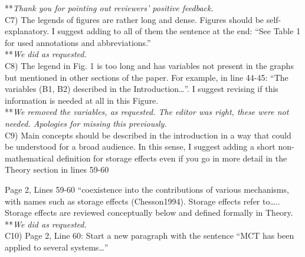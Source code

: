 \documentclass[letterpaper,11pt]{article}
\begin{document}
\noindent ***\emph{Thank you for pointing out reviewers' positive feedback.} \\

\noindent C7) The legends of figures are rather long and dense. Figures should be self-explanatory. I suggest adding to all of them the sentence at the end: “See Table 1 for used annotations and abbreviations.” \\

\noindent ***\emph{We did as requested.} \\

\noindent C8) The legend in Fig. 1 is too long and has variables not present in the graphs but mentioned in other sections of the paper. For example, in line 44-45: “The variables (B1, B2) described in the Introduction…”. I suggest revising if this information is needed at all in this Figure. \\

\noindent ***\emph{We removed the variables, as requested. The editor was right, these were not
needed. Apologies for missing this previously.} \\

\noindent C9) Main concepts should be described in the introduction in a way that could be understood for a broad audience. In this sense, I suggest adding a short non- mathematical definition for storage effects even if you go in more detail in the Theory section in lines 59-60 

Page 2, Lines 59-60 “coexistence into the contributions of various mechanisms, with names such as storage effects (Chesson1994). Storage effects refer to….. Storage effects are reviewed conceptually below and defined formally in Theory. \\  

\noindent ***\emph{We did as requested.} \\

\noindent C10)  Page 2, Line 60: Start a new paragraph with the sentence “MCT has been applied to several systems…” \\
\end{document}
